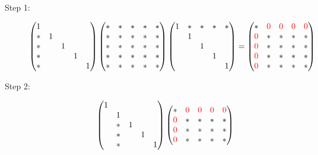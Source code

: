 \documentclass[computationalMathematics.tex]{subfiles}
\begin{document}
\begin{description}
  \item[{\sc Step 1:}]
    \[
\begin{pmatrix}
    1\\
    \ast & 1\\
    \ast & & 1\\
    \ast  & & & 1\\
    \ast & & & & 1
\end{pmatrix}
\begin{pmatrix}
    \ast & \ast & \ast & \ast & \ast\\
    \ast & \ast & \ast & \ast & \ast\\
    \ast & \ast & \ast & \ast & \ast\\
    \ast & \ast & \ast & \ast & \ast\\
    \ast & \ast & \ast & \ast & \ast\\
\end{pmatrix}
\begin{pmatrix}
    1 & \ast & \ast & \ast & \ast\\
    & 1\\
    & & 1\\
    & & & 1\\
    & & & & 1
\end{pmatrix}
=
\begin{pmatrix}
    \ast & {\color{red} 0} & {\color{red} 0} & {\color{red} 0} & {\color{red} 0}\\
    {\color{red} 0} & \ast & \ast & \ast & \ast\\
    {\color{red} 0} & \ast & \ast & \ast & \ast\\
    {\color{red} 0} & \ast & \ast & \ast & \ast\\
    {\color{red} 0} & \ast & \ast & \ast & \ast\\
\end{pmatrix}
\]
  \item[{\sc Step 2:}]
\[
\begin{pmatrix}
    1 & \\
    & 1\\
    & \ast & 1\\
    & \ast & & 1\\
    & \ast & & & 1
\end{pmatrix}
\begin{pmatrix}
    \ast & {\color{red} 0} & {\color{red} 0} & {\color{red} 0} & {\color{red} 0}\\
    {\color{red} 0} & \ast & \ast & \ast & \ast\\
    {\color{red} 0} & \ast & \ast & \ast & \ast\\
    {\color{red} 0} & \ast & \ast & \ast & \ast\\

\end{pmatrix}\]
\end{description}
\end{document}
